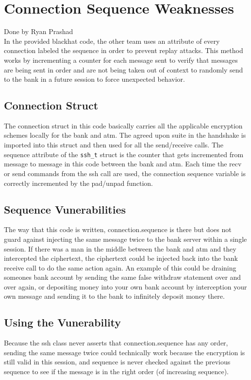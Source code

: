 \section{Connection Sequence Weaknesses}\label{sec:conseq}
Done by Ryan Prashad\\

	\medskip
	In the provided blackhat code, the other team uses an attribute of every connection labeled the sequence in order to prevent replay attacks. This method works by incrementing a counter for each message sent to verify that messages are being sent in order and are not being taken out of context to randomly send to the bank in a future session to force unexpected behavior.
	
	\subsection{Connection Struct}\label{sec:connstruct}
		The connection struct in this code basically carries all the applicable encryption schemes locally for the bank and atm. The agreed upon suite in the handshake is imported into this struct and then used for all the send/receive calls. The sequence attribute of the \texttt{ssh\_t} struct is the counter that gets incremented from message to message in this code between the bank and atm. Each time the recv or send commands from the ssh call are used, the connection sequence variable is correctly incremented by the pad/unpad function.
	
	\subsection{Sequence Vunerabilities}\label{sec:seqvun}
		The way that this code is written, connection.sequence is there but does not guard against injecting the same message twice to the bank server within a single session. If there was a man in the middle between the bank and atm and they intercepted the ciphertext, the ciphertext could be injected back into the bank receive call to do the same action again. An example of this could be draining someones bank account by sending the same false withdraw statement over and over again, or depositing money into your own bank account by interception your own message and sending it to the bank to infinitely deposit money there.
	
	\subsection{Using the Vunerability}\label{sec:usevun}
		Because the ssh class never asserts that connection.sequence has any order, sending the same message twice could technically work because the encryption is still valid in this session, and sequence is never checked against the previous sequence to see if the message is in the right order (of increasing sequence).
	
